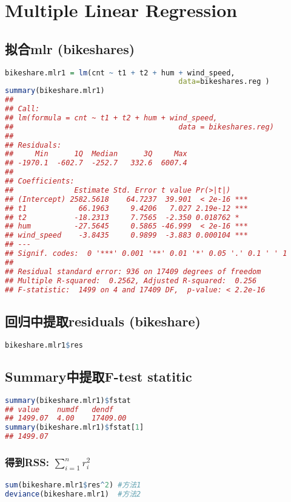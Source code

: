 \documentclass[11pt,a4paper]{article}
\begin{document}
\section{Multiple Linear Regression}
\subsection{拟合mlr (bikeshares)}
\begin{lstlisting}[language=R]
bikeshare.mlr1 = lm(cnt ~ t1 + t2 + hum + wind_speed,
                                        data=bikeshares.reg )
summary(bikeshare.mlr1)
## 
## Call:
## lm(formula = cnt ~ t1 + t2 + hum + wind_speed,
##                                      data = bikeshares.reg)
## 
## Residuals:
##     Min      1Q  Median      3Q     Max 
## -1970.1  -602.7  -252.7   332.6  6007.4 
## 
## Coefficients:
##              Estimate Std. Error t value Pr(>|t|)    
## (Intercept) 2582.5618    64.7237  39.901  < 2e-16 ***
## t1            66.1963     9.4206   7.027 2.19e-12 ***
## t2           -18.2313     7.7565  -2.350 0.018762 *  
## hum          -27.5645     0.5865 -46.999  < 2e-16 ***
## wind_speed    -3.8435     0.9899  -3.883 0.000104 ***
## ---
## Signif. codes:  0 '***' 0.001 '**' 0.01 '*' 0.05 '.' 0.1 ' ' 1
## 
## Residual standard error: 936 on 17409 degrees of freedom
## Multiple R-squared:  0.2562, Adjusted R-squared:  0.256 
## F-statistic:  1499 on 4 and 17409 DF,  p-value: < 2.2e-16
\end{lstlisting}

\subsection{回归中提取residuals (bikeshare)}
\begin{lstlisting}[language=R]
bikeshare.mlr1$res
\end{lstlisting}
\subsection{Summary中提取F-test statitic}
\begin{lstlisting}[language=R]
summary(bikeshare.mlr1)$fstat
## value    numdf   dendf
## 1499.07  4.00    17409.00
summary(bikeshare.mlr1)$fstat[1]
## 1499.07
\end{lstlisting}
\subsubsection{得到RSS: $\sum_{i=1}^nr_i^2$}
\begin{lstlisting}[language=R]
sum(bikeshare.mlr1$res^2) #方法1
deviance(bikeshare.mlr1)  #方法2
\end{lstlisting}
\end{document}
